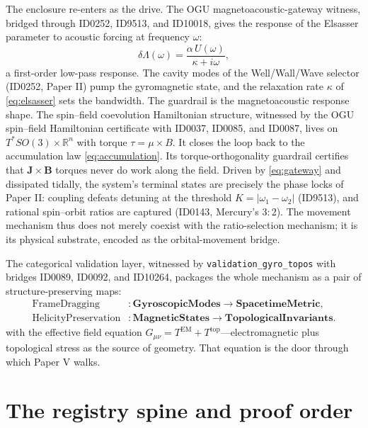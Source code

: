 \documentclass[11pt]{article}
\theoremstyle{remark}
\begin{document}
The enclosure re-enters as the drive. The OGU magnetoacoustic-gateway witness, bridged through ID0252, ID9513, and ID10018, gives the response of the Elsasser parameter to acoustic forcing at frequency $\omega$:
\begin{equation}
\delta\Lambda(\omega) = \frac{\alpha\, U(\omega)}{\kappa + i\omega},
\label{eq:gateway}
\end{equation}
a first-order low-pass response. The cavity modes of the Well/Wall/Wave selector (ID0252, Paper II) pump the gyromagnetic state, and the relaxation rate $\kappa$ of \eqref{eq:elsasser} sets the bandwidth. The guardrail is the magnetoacoustic response shape. The spin--field coevolution Hamiltonian structure, witnessed by the OGU spin--field Hamiltonian certificate with ID0037, ID0085, and ID0087, lives on $T^* SO(3) \times \mathbb{R}^n$ with torque $\tau = \mu \times B$. It closes the loop back to the accumulation law \eqref{eq:accumulation}. Its torque-orthogonality guardrail certifies that $\mathbf{J} \times \mathbf{B}$ torques never do work along the field. Driven by \eqref{eq:gateway} and dissipated tidally, the system's terminal states are precisely the phase locks of Paper II: coupling defeats detuning at the threshold $K = |\omega_1 - \omega_2|$ (ID9513), and rational spin--orbit ratios are captured (ID0143, Mercury's $3{:}2$). The movement mechanism thus does not merely coexist with the ratio-selection mechanism; it is its physical substrate, encoded as the orbital-movement bridge.

The categorical validation layer, witnessed by \texttt{validation\_gyro\_topos} with bridges ID0089, ID0092, and ID10264, packages the whole mechanism as a pair of structure-preserving maps:
\begin{equation}
\begin{aligned}
\mathrm{FrameDragging}&: \mathbf{GyroscopicModes} \to \mathbf{SpacetimeMetric},\\
\mathrm{HelicityPreservation}&: \mathbf{MagneticStates} \to \mathbf{TopologicalInvariants}.
\end{aligned}
\end{equation}
with the effective field equation $G_{\mu\nu} = T^{\mathrm{EM}} + T^{\mathrm{top}}$---electromagnetic plus topological stress as the source of geometry. That equation is the door through which Paper V walks.

\section{The registry spine and proof order}
\label{sec:registry}
\end{document}

